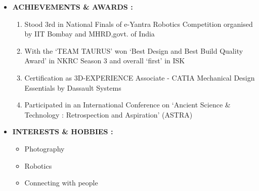 \documentclass[11pt]{article}
\begin{document}
\begin{itemize}[label=$\star$]
\newpage
\item	\begin{large} \textbf{ACHIEVEMENTS \& AWARDS :} \end{large}
\begin{enumerate}
	\item Stood 3rd in National Finals of e-Yantra Robotics Competition organised by IIT Bombay and 
	MHRD,govt. of India
	\item With the ‘TEAM TAURUS’ won ‘Best Design and Best Build Quality Award’ in NKRC Season 3 and overall ‘first’ in ISK 
	\item Certification as 3D-EXPERIENCE Associate - CATIA Mechanical Design Essentials by Dassault Systems
	\item Participated in an International Conference on ‘Ancient Science \& Technology : Retrospection and Aspiration’ (ASTRA)
\end{enumerate}

	\bigskip
\item	\begin{large} \textbf{INTERESTS \& HOBBIES :} \end{large}
\begin{itemize}[label=$\bullet$]
	\item Photography
	\item Robotics
	\item Connecting with people
\end{itemize}

\end{itemize}
\end{document}
